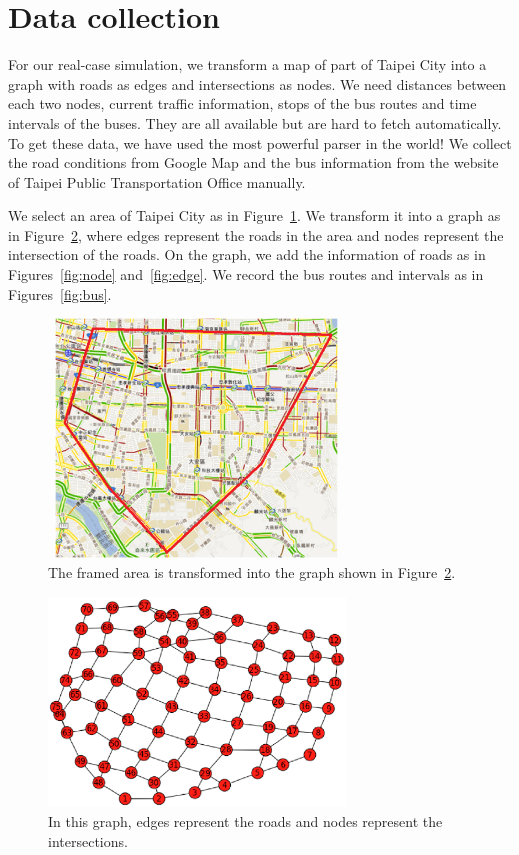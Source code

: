 \documentclass{sig-alternate}
\begin{document}
\section{Data collection}
For our real-case simulation, we transform a map of part of Taipei City into a graph with roads as edges and intersections as nodes.
We need distances between each two nodes, current traffic information, stops of the bus routes and time intervals of the buses.
They are all available but are hard to fetch automatically.
To get these data, we have used the most powerful parser in the world!
We collect the road conditions from Google Map and the bus information from the website of Taipei Public Transportation Office manually.

We select an area of Taipei City as in Figure~\ref{fig:tpemap}.
We transform it into a graph as in Figure~\ref{fig:graphex}, where edges represent the roads in the area and nodes represent the intersection of the roads.
On the graph, we add the information of roads as in Figures~\ref{fig:node} and~\ref{fig:edge}.
We record the bus routes and intervals as in Figures~\ref{fig:bus}.

\begin{figure}
\centering
\includegraphics[height=2.5in, width=3.1in]{taipeimap.eps}
\caption{The framed area is transformed into the graph shown in Figure~\ref{fig:graphex}.}
\label{fig:tpemap}
\end{figure}

\begin{figure}
\centering
\includegraphics[height=2.2in, width=3.1in]{graphexample.eps}
\caption{In this graph, edges represent the roads and nodes represent the intersections.}
\label{fig:graphex}
\end{figure}
\end{document}
